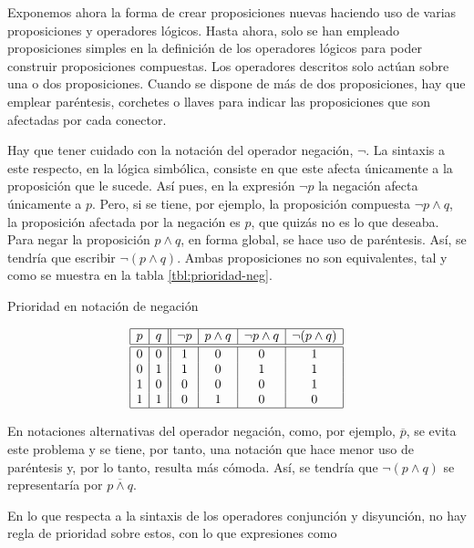 



Exponemos ahora la forma de crear proposiciones nuevas haciendo uso de
varias proposiciones y operadores lógicos. Hasta ahora, solo se han empleado
proposiciones simples en la definición de los operadores lógicos para poder
construir proposiciones compuestas. Los operadores descritos solo actúan
sobre una o dos proposiciones. Cuando se dispone de más de dos
proposiciones, hay que emplear paréntesis, corchetes o llaves para indicar
las proposiciones que son afectadas por cada conector.

Hay que tener cuidado con la notación del operador negación, $\neg$. La
sintaxis a este respecto, en la lógica simbólica, consiste en que este
afecta únicamente a la proposición que le sucede. Así pues, en la expresión
$\neg p$ la negación afecta únicamente a $p$. Pero, si se tiene, por
ejemplo, la proposición compuesta $\neg p \land q$, la proposición afectada
por la negación es $p$, que quizás no es lo que deseaba. Para negar la
proposición $p \land q$, en forma global, se hace uso de paréntesis. Así, se
tendría que escribir $\neg (p \land q)$. Ambas proposiciones no son
equivalentes, tal y como se muestra en la tabla \ref{tbl:prioridad-neg}.

\begin{table}[h]%
  \caption{Prioridad en notación de negación}
  \label{tbl:prioridad-neg}%
  \centering
  $$
    \begin{array}{|c|c||c|c|c|c|}
      \hline
      p & q & \neg p & p \land q & \neg p \land q & \neg (p \land q) \\
      \hline
      \hline
      0 & 0 & 1 & 0 & 0 & 1 \\
      0 & 1 & 1 & 0 & 1 & 1 \\
      1 & 0 & 0 & 0 & 0 & 1 \\
      1 & 1 & 0 & 1 & 0 & 0 \\
      \hline
    \end{array}
  $$
\end{table}

En notaciones alternativas del operador negación, como, por ejemplo,
$\overline{p}$, se evita este problema y se tiene, por tanto, una notación
que hace menor uso de paréntesis y, por lo tanto, resulta más cómoda. Así,
se tendría que $\neg (p \land q)$ se representaría por $\overline{p \land
q}$.

En lo que respecta a la sintaxis de los operadores conjunción y disyunción,
no hay regla de prioridad sobre estos, con lo que expresiones como

